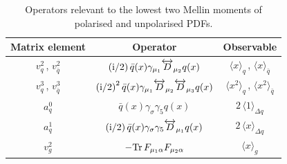 \begin{table}
\renewcommand{\arraystretch}{1.6} 
\centering
\begin{tabular}{@{}ccc@{}}
\hline 
Matrix element & Operator & Observable \\ 
\hline
$v_q^2$\,, $v_{\bar{q}}^2$  & $\displaystyle \left({\rm i}/2\right) \bar{q}(x)\gamma_{\mu_1} \overleftrightarrow{D}_{\mu_2} q(x)$ & $\langle x \rangle_q$\,, $\langle x \rangle_{\bar{q}}$   \\
$v_q^3$\,, $v_{\bar{q}}^3$  & $\displaystyle \left({\rm i}/2\right)^2 \bar{q}(x)\gamma_{\mu_1} \overleftrightarrow{D}_{\mu_2} \overleftrightarrow{D}_{\mu_3} q(x)$ & $\langle x^2 \rangle_q$\,, $\langle x^2 \rangle_{\bar{q}}$ \\
$a_q^0$ & $\displaystyle \bar{q}(x)\gamma_{\sigma} \gamma_5 q(x)$ & $2\, \langle 1 \rangle_{\Delta q}$ \\
$a_q^1$ & $\displaystyle \left({\rm i}/2\right) \bar{q}(x)\gamma_{\sigma} \gamma_5 \overleftrightarrow{D}_{\mu_1} q(x)$ & $2\, \langle x \rangle_{\Delta q}$ \\
$v_g^2$ & $\displaystyle - {\rm Tr}\, F_{\mu_1\alpha}F_{\mu_2\alpha}$ & $\langle x \rangle_g$ \\
\hline
\end{tabular}
\caption{\label{Tab:twist2}
Operators relevant to the lowest two Mellin moments of polarised and unpolarised PDFs.
}
\end{table}

